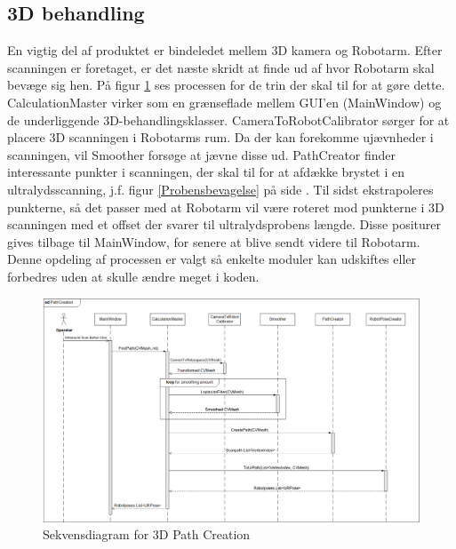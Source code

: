 \subsection{3D behandling}
En vigtig del af produktet er bindeledet mellem 3D kamera og Robotarm. Efter scanningen er foretaget, er det næste skridt at finde ud af hvor Robotarm skal bevæge sig hen. På figur \ref{seq_pathcreation} ses processen for de trin der skal til for at gøre dette. CalculationMaster virker som en grænseflade mellem GUI'en (MainWindow) og de underliggende 3D-behandlingsklasser. CameraToRobotCalibrator sørger for at placere 3D scanningen i Robotarms rum. Da der kan forekomme ujævnheder i scanningen, vil Smoother forsøge at jævne disse ud. PathCreator finder interessante punkter i scanningen, der skal til for at afdække brystet i en ultralydsscanning, j.f. figur \ref{Probensbevagelse} på side \pageref{Probensbevagelse}. Til sidst ekstrapoleres punkterne, så det passer med at Robotarm vil være roteret mod punkterne i 3D scanningen med et offset der svarer til ultralydsprobens længde.
Disse positurer gives tilbage til MainWindow, for senere at blive sendt videre til Robotarm. 
Denne opdeling af processen er valgt så enkelte moduler kan udskiftes eller forbedres uden at skulle ændre meget i koden.
\begin{figure}[H]
    \centering
    \includegraphics[width=1\textwidth]{figurer/d/Design/Sequence/sd_pathcreation}
    \caption{Sekvensdiagram for 3D Path Creation}
    \label{seq_pathcreation}
\end{figure}